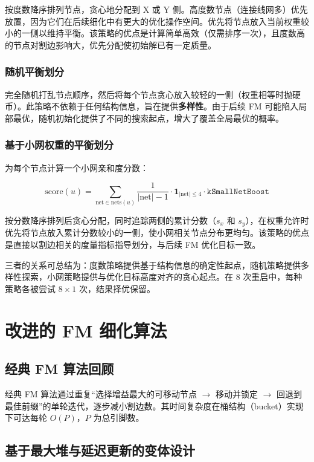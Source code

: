 \documentclass[journal, twocolumn]{IEEEtran}
\begin{document}
按度数降序排列节点，贪心地分配到 X 或 Y 侧。高度数节点（连接线网多）优先放置，因为它们在后续细化中有更大的优化操作空间。优先将节点放入当前权重较小的一侧以维持平衡。该策略的优点是计算简单高效（仅需排序一次），且度数高的节点对割边影响大，优先分配使初始解已有一定质量。

\subsubsection{随机平衡划分}

完全随机打乱节点顺序，然后将每个节点贪心放入较轻的一侧（权重相等时抛硬币）。此策略不依赖于任何结构信息，旨在提供\textbf{多样性}。由于后续 FM 可能陷入局部最优，随机初始化提供了不同的搜索起点，增大了覆盖全局最优的概率。

\subsubsection{基于小网权重的平衡划分}

为每个节点计算一个小网亲和度分数：

\begin{equation}
\text{score}(u) = \sum_{\text{net} \in \text{nets}(u)} \frac{1}{|\text{net}| - 1} \cdot \mathbf{1}_{|\text{net}| \le 4} \cdot \texttt{kSmallNetBoost}
\end{equation}

按分数降序排列后贪心分配，同时追踪两侧的累计分数（$s_x$ 和 $s_y$），在权重允许时优先将节点放入累计分数较小的一侧，使小网相关节点分布更均匀。该策略的优点是直接以割边相关的度量指标指导划分，与后续 FM 优化目标一致。

三者的关系可总结为：度数策略提供基于结构信息的确定性起点，随机策略提供多样性探索，小网策略提供与优化目标高度对齐的贪心起点。在 8 次重启中，每种策略各被尝试 $8 \times 1$ 次，结果择优保留。

\section{改进的 FM 细化算法}

\subsection{经典 FM 算法回顾}

经典 FM 算法通过重复“选择增益最大的可移动节点 $\to$ 移动并锁定 $\to$ 回退到最佳前缀”的单轮迭代，逐步减小割边数。其时间复杂度在桶结构（bucket）实现下可达每轮 $O(P)$，$P$ 为总引脚数。

\subsection{基于最大堆与延迟更新的变体设计}
\end{document}
